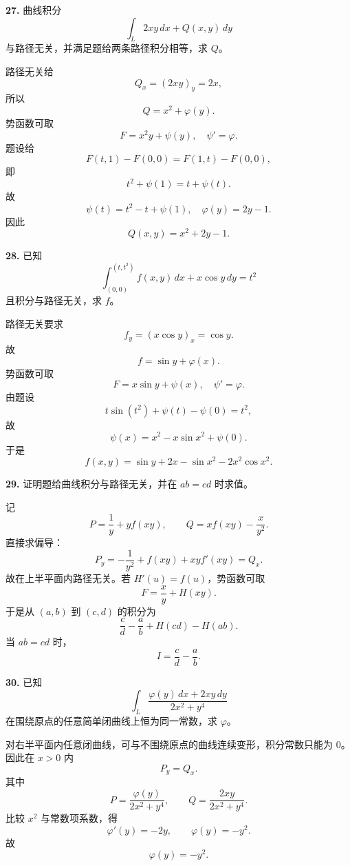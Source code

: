\begin{problemblock}
\textbf{27.} 曲线积分
\[
\int_L2xy\,dx+Q(x,y)\,dy
\]
与路径无关，并满足题给两条路径积分相等，求 \(Q\)。
\end{problemblock}
\begin{solutionblock}
路径无关给
\[
Q_x=(2xy)_y=2x,
\]
所以
\[
Q=x^2+\varphi(y).
\]
势函数可取
\[
F=x^2y+\psi(y),\quad \psi'=\varphi.
\]
题设给
\[
F(t,1)-F(0,0)=F(1,t)-F(0,0),
\]
即
\[
t^2+\psi(1)=t+\psi(t).
\]
故
\[
\psi(t)=t^2-t+\psi(1),
\quad
\varphi(y)=2y-1.
\]
因此
\[
\boxed{Q(x,y)=x^2+2y-1}.
\]
\end{solutionblock}

\begin{problemblock}
\textbf{28.} 已知
\[
\int_{(0,0)}^{(t,t^2)}f(x,y)\,dx+x\cos y\,dy=t^2
\]
且积分与路径无关，求 \(f\)。
\end{problemblock}
\begin{solutionblock}
路径无关要求
\[
f_y=(x\cos y)_x=\cos y.
\]
故
\[
f=\sin y+\varphi(x).
\]
势函数可取
\[
F=x\sin y+\psi(x),\quad \psi'=\varphi.
\]
由题设
\[
t\sin(t^2)+\psi(t)-\psi(0)=t^2,
\]
故
\[
\psi(x)=x^2-x\sin x^2+\psi(0).
\]
于是
\[
\boxed{f(x,y)=\sin y+2x-\sin x^2-2x^2\cos x^2}.
\]
\end{solutionblock}

\begin{problemblock}
\textbf{29.} 证明题给曲线积分与路径无关，并在 \(ab=cd\) 时求值。
\end{problemblock}
\begin{solutionblock}
记
\[
P=\frac1y+yf(xy),\qquad Q=xf(xy)-\frac{x}{y^2}.
\]
直接求偏导：
\[
P_y=-\frac1{y^2}+f(xy)+xyf'(xy)=Q_x.
\]
故在上半平面内路径无关。若 \(H'(u)=f(u)\)，势函数可取
\[
F=\frac{x}{y}+H(xy).
\]
于是从 \((a,b)\) 到 \((c,d)\) 的积分为
\[
\frac{c}{d}-\frac{a}{b}+H(cd)-H(ab).
\]
当 \(ab=cd\) 时，
\[
\boxed{I=\frac{c}{d}-\frac{a}{b}}.
\]
\end{solutionblock}

\begin{problemblock}
\textbf{30.} 已知
\[
\int_L\frac{\varphi(y)\,dx+2xy\,dy}{2x^2+y^4}
\]
在围绕原点的任意简单闭曲线上恒为同一常数，求 \(\varphi\)。
\end{problemblock}
\begin{solutionblock}
对右半平面内任意闭曲线，可与不围绕原点的曲线连续变形，积分常数只能为 \(0\)。因此在 \(x>0\) 内
\[
P_y=Q_x.
\]
其中
\[
P=\frac{\varphi(y)}{2x^2+y^4},\qquad Q=\frac{2xy}{2x^2+y^4}.
\]
比较 \(x^2\) 与常数项系数，得
\[
\varphi'(y)=-2y,\qquad \varphi(y)=-y^2.
\]
故
\[
\boxed{\varphi(y)=-y^2}.
\]
\end{solutionblock}

